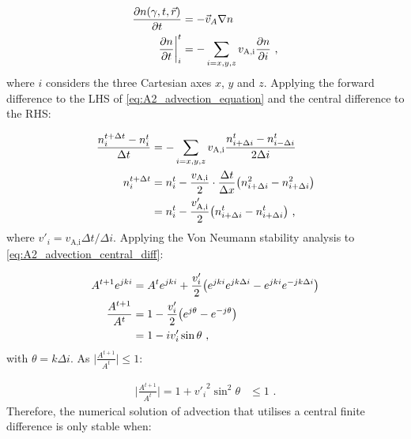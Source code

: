 \begin{equation}
    \begin{aligned}
    \pdv{n\qty(\gamma,t,\vec{r})}{t}&=-\vec{v}_A\nabla n  \\
    \pdv{n}{t}\bigg|_{i}^t&=-\sum_{i=x,y,z}v_\text{A,i}\pdv{n}{i}\text{ ,} 
    \end{aligned} \label{eq:A2_advection_equation}
\end{equation}
\noindent where $i$ considers the three Cartesian axes $x$, $y$ and $z$. Applying the forward difference to the LHS of \autoref{eq:A2_advection_equation} and the central difference to the RHS:

\begin{equation}
    \begin{aligned}
    \frac{n^{t+\Delta t}_i-n^t_i}{\Delta t}&=-\sum_{i=x,y,z} v_\text{A,i}\frac{n_{i+\Delta i}^t-n_{i-\Delta i}^t}{2\Delta i} \\
    n_i^{t+\Delta t}&=n_i^t-\frac{v_\text{A,i}}{2}\cdot\frac{\Delta t}{\Delta x}\qty(n_{i+\Delta i}^2-n_{i+\Delta i}^2) \\
    &=n_i^t-\frac{v_\text{A,i}'}{2}\qty(n_{i+\Delta i}^t-n_{i+\Delta i}^t)\text{ ,} 
    \end{aligned} \label{eq:A2_advection_central_diff}
\end{equation}
\noindent where $v'_i= v_\text{A,i}{\Delta t}/{\Delta i}$. Applying the Von Neumann stability analysis to \autoref{eq:A2_advection_central_diff}:

\begin{equation}
    \begin{aligned}
    A^{t+1}e^{jki}&=A^te^{jki}+\frac{v'_i}{2}\qty(e^{jki}e^{jk\Delta i}-e^{jki}e^{-jk\Delta i}) \\
    \frac{A^{t+1}}{A^t}&=1-\frac{v'_i}{2}\qty(e^{j\theta}-e^{-j\theta}) \\
    &=1-iv'_i\sin\theta\text{ ,} 
    \end{aligned}
\end{equation}
\noindent with $\theta=k\Delta i$. As $\lvert \frac{A^{t+1}}{A^t}\rvert\leq 1$:

\begin{equation}
    \begin{aligned}
        \bigg| \frac{A^{t+1}}{A^t}\bigg|=1+{v'_i}^2\sin^2\theta &\leq1\text{ .} 
    \end{aligned}
\end{equation}
\noindent Therefore, the numerical solution of advection that utilises a central finite difference is only stable when:

